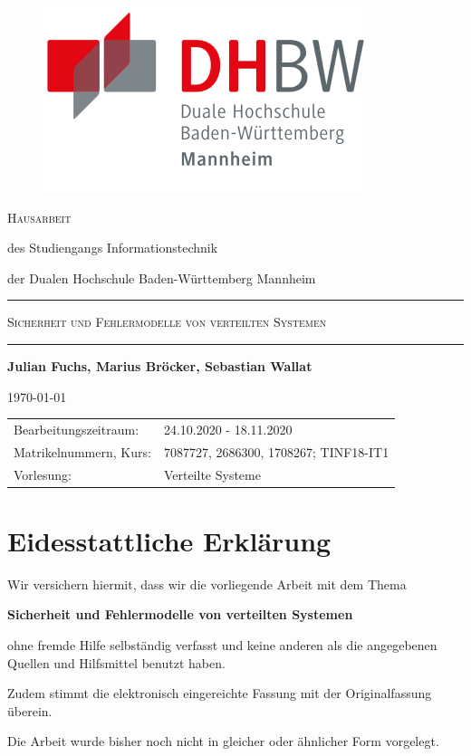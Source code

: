 \documentclass[12pt,a4paper,parskip=half]{scrreprt}
\begin{document}
	
	\begin{titlepage}
		
		\centering
				
		\begin{figure}
			\raggedright
			\includegraphics[width = .25\textwidth, right]{dhbw-logo}
		\end{figure}
		
		\bigskip
		
		\Large\textsc{Hausarbeit}
		
		\normalsize
		
		des Studiengangs Informationstechnik \par
		der Dualen Hochschule Baden-Württemberg Mannheim
		
		\rule{\textwidth}{.5mm}\bigskip
		
		\textsc{\large Sicherheit und Fehlermodelle von verteilten Systemen}	
		
		\rule{\textwidth}{.5mm}
		
		\vfill
		
		\par
		
		{\bfseries\large Julian Fuchs, Marius Bröcker, Sebastian Wallat} \par
		\today
		
		\vfill
		
		\small{%
			\begin{tabularx}{\textwidth}{@{}lX@{}}
				\toprule
				Bearbeitungszeitraum: & 24.10.2020 - 18.11.2020 \\
				Matrikelnummern, Kurs: & 7087727, 2686300, 1708267; TINF18-IT1 \\
				Vorlesung: & Verteilte Systeme \\
			\end{tabularx}
		}
		
		\cleardoublepage
		
	\end{titlepage}
	
	\newpage
	
	\chapter*{Eidesstattliche Erklärung}

		\vspace{50pt}
		Wir versichern hiermit, dass wir die vorliegende Arbeit mit dem Thema \par
		\quad\textbf{\glqq{}Sicherheit und Fehlermodelle von verteilten Systemen\grqq{}} \par
		ohne fremde Hilfe selbständig verfasst und keine anderen als die angegebenen Quellen und Hilfsmittel benutzt haben. \par
		Zudem stimmt die elektronisch eingereichte Fassung mit der Originalfassung überein. \par
		Die Arbeit wurde bisher noch nicht in gleicher oder ähnlicher Form vorgelegt.
		
\end{document}
